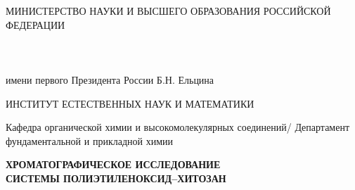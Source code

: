 \documentclass[a4paper,14pt]{extarticle}
\newcommand{\VKRInstitute}{Институт естественных наук и математики}
\newcommand{\VKRDepartment}{Кафедра органической химии и высокомолекулярных соединений/ Департамент фундаментальной и прикладной химии}
\begin{document}
\renewcommand{\contentsname}{СОДЕРЖАНИЕ}
\renewcommand{\refname}{СПИСОК ИСПОЛЬЗОВАННЫХ ИСТОЧНИКОВ И ЛИТЕРАТУРЫ}
\renewcommand{\figurename}{Рисунок}
\renewcommand{\tablename}{Таблица}

\thispagestyle{empty}
\begingroup
\singlespacing
{}
\setlength{\parindent}{0pt}
\vspace*{-18.2pt}
{\centering
МИНИСТЕРСТВО НАУКИ И ВЫСШЕГО ОБРАЗОВАНИЯ РОССИЙСКОЙ ФЕДЕРАЦИИ\\
\\
\\
\\
имени первого Президента России Б.Н. Ельцина\par}

\vspace{1\baselineskip}
{\centering \MakeUppercase{\VKRInstitute}\par}

\vspace{3.95\baselineskip}

{\centering \VKRDepartment\par}

\vspace{1.99\baselineskip}

{\centering
\textbf{ХРОМАТОГРАФИЧЕСКОЕ ИССЛЕДОВАНИЕ}\\
\textbf{СИСТЕМЫ ПОЛИЭТИЛЕНОКСИД–ХИТОЗАН}\par}
\end{document}
